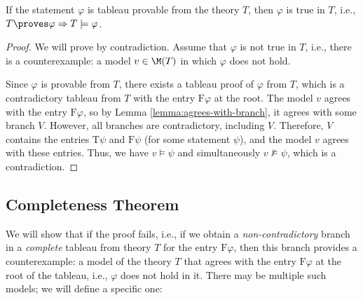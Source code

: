 \begin{theorem}[Correctness]
If the statement $\varphi$ is tableau provable from the theory $T$, then $\varphi$ is true in $T$, i.e., $T \proves \varphi \Rightarrow T \models \varphi$.    
\end{theorem}

\begin{proof}
We will prove by contradiction. Assume that $\varphi$ is not true in $T$, i.e., there is a counterexample: a model $v \in \M(T)$ in which $\varphi$ does not hold.

Since $\varphi$ is provable from $T$, there exists a tableau proof of $\varphi$ from $T$, which is a contradictory tableau from $T$ with the entry $\mathrm{F}\varphi$ at the root. The model $v$ agrees with the entry $\mathrm{F}\varphi$, so by Lemma \ref{lemma:agrees-with-branch}, it agrees with some branch $V$. However, all branches are contradictory, including $V$. Therefore, $V$ contains the entries $\mathrm{T}\psi$ and $\mathrm{F}\psi$ (for some statement $\psi$), and the model $v$ agrees with these entries. Thus, we have $v \models \psi$ and simultaneously $v \not\models \psi$, which is a contradiction.
\end{proof}

\subsection{Completeness Theorem}

We will show that if the proof fails, i.e., if we obtain a \emph{non-contradictory} branch in a \emph{complete} tableau from theory $T$ for the entry $\mathrm{F}\varphi$, then this branch provides a counterexample: a model of the theory $T$ that agrees with the entry $\mathrm{F}\varphi$ at the root of the tableau, i.e., $\varphi$ does not hold in it. There may be multiple such models; we will define a specific one:

